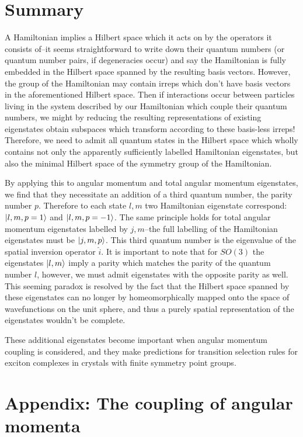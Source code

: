 \documentclass[12pt]{article}
\begin{document}
	\section{Summary}
	
	A Hamiltonian implies a Hilbert space which it acts on by the operators it consists of--it seems straightforward to write down their quantum numbers (or quantum number pairs, if degeneracies occur) and say the Hamiltonian is fully embedded in the Hilbert space spanned by the resulting basis vectors. However, the group of the Hamiltonian may contain irreps which don't have basis vectors in the aforementioned Hilbert space. Then if interactions occur between particles living in the system described by our Hamiltonian which couple their quantum numbers, we might by reducing the resulting representations of existing eigenstates obtain subspaces which transform according to these basis-less irreps! Therefore, we need to admit all quantum states in the Hilbert space which wholly contains not only the apparently sufficiently labelled Hamiltonian eigenstates, but also the minimal Hilbert space of the symmetry group of the Hamiltonian.
	
	By applying this to angular momentum and total angular momentum eigenstates, we find that they necessitate an addition of a third quantum number, the parity number $p$. Therefore to each state $l,m$ two Hamiltonian eigenstate correspond: $\ket{l,m,p=1}$ and $\ket{l,m,p=-1}$. The same principle holds for total angular momentum eigenstates labelled by $j,m$--the full labelling of the Hamiltonian eigenstates must be $\ket{j,m,p}$. This third quantum number is the eigenvalue of the spatial inversion operator $\hat{i}$. It is important to note that for $SO(3)$ the eigenstates $\ket{l,m}$ imply a parity which matches the parity of the quantum number $l$, however, we must admit eigenstates with the opposite parity as well. This seeming paradox is resolved by the fact that the Hilbert space spanned by these eigenstates can no longer by homeomorphically mapped onto the space of wavefunctions on the unit sphere, and thus a purely spatial representation of the eigenstates wouldn't be complete.
	
	These additional eigenstates become important when angular momentum coupling is considered, and they make predictions for transition selection rules for exciton complexes in crystals with finite symmetry point groups.
	
	\appendix
	
	\section{Appendix: The coupling of angular momenta}
	
\end{document}
